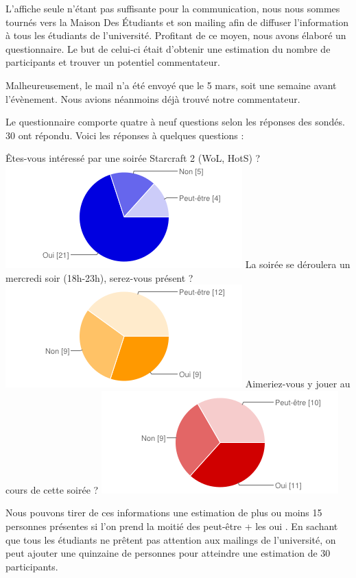 L’affiche seule n’étant pas suffisante pour la communication, nous nous sommes tournés vers la
Maison Des Étudiants et son mailing afin de diffuser l’information à tous les étudiants de l’université.
Profitant de ce moyen, nous avons élaboré un questionnaire. Le but de celui-ci était d’obtenir une estimation
du nombre de participants et trouver un potentiel commentateur.

Malheureusement, le mail n’a été envoyé que le 5 mars, soit une semaine avant l’évènement.
Nous avions néanmoins déjà trouvé notre commentateur.

Le questionnaire comporte quatre à neuf questions selon les réponses des sondés. 30 ont répondu.
Voici les réponses à quelques questions :


Êtes-vous intéressé par une soirée Starcraft 2 (WoL, HotS) ?
\includegraphics{images/1.chart.png}
La soirée se déroulera un mercredi soir (18h-23h), serez-vous présent ?
\includegraphics{images/2.chart.png}
Aimeriez-vous y jouer au cours de cette soirée ?
\includegraphics{images/3.chart.png}

Nous pouvons tirer de ces informations une estimation de plus ou moins 15 personnes présentes si l’on prend
la moitié des \og peut-être \fg{} + les \og oui \fg{}.
En sachant que tous les étudiants ne prêtent pas attention aux mailings de l’université, on peut ajouter
une quinzaine de personnes pour atteindre une estimation de 30 participants.

